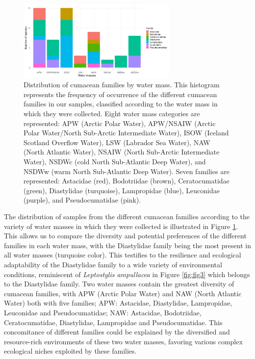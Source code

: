 \begin{figure}[htbp]
    \centering
    \includegraphics[width=0.7\textwidth]{figure3.png}
    \caption{Distribution of cumacean families by water mass. This histogram represents the frequency of occurrence of the different cumacean families in our samples, classified according to the water mass in which they were collected. Eight water mass categories are represented: APW (Arctic Polar Water), APW/NSAIW (Arctic Polar Water/North Sub-Arctic Intermediate Water), ISOW (Iceland Scotland Overflow Water), LSW (Labrador Sea Water), NAW (North Atlantic Water), NSAIW (North Sub-Arctic Intermediate Water), NSDWc (cold North Sub-Atlantic Deep Water), and NSDWw (warm North Sub-Atlantic Deep Water). Seven families are represented: Astacidae (red), Bodotriidae (brown), Ceratocumatidae (green), Diastylidae (turquoise), Lampropidae (blue), Leuconidae (purple), and Pseudocumatidae (pink). \label{fig:fig4}}
\end{figure}

The distribution of samples from the different cumacean families according to the variety of water masses in which they were collected is illustrated in Figure \ref{fig:fig4}. This allows us to compare the diversity and potential preferences of the different families in each water mass, with the Diastylidae family being the most present in all water masses (turquoise color). This testifies to the resilience and ecological adaptability of the Diastylidae family to a wide variety of environmental conditions, reminiscent of \emph{Leptostylis ampullacea} in Figure \ref{fig:fig3} which belongs to the Diastylidae family. Two water masses contain the greatest diversity of cumacean families, with APW (Arctic Polar Water) and NAW (North Atlantic Water) both with five families; APW: Astacidae, Diastylidae, Lampropidae, Leuconidae and Pseudocumatidae; NAW: Astacidae, Bodotriidae, Ceratocumatidae, Diastylidae, Lampropidae and Pseudocumatidae. This concomitance of different families could be explained by the diversified and resource-rich environments of these two water masses, favoring various complex ecological niches exploited by these families.

